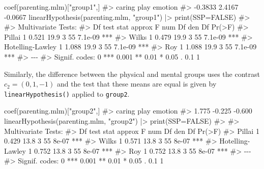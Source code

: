 \documentclass[
  letterpaper,
  10pt,
  krantz2]{krantz}
\makeatletter
\newenvironment{Shaded}{\begin{snugshade}}{\end{snugshade}}
\newcommand{\AttributeTok}[1]{\textcolor[rgb]{0.40,0.45,0.13}{#1}}
\newcommand{\CommentTok}[1]{\textcolor[rgb]{0.37,0.37,0.37}{#1}}
\newcommand{\ConstantTok}[1]{\textcolor[rgb]{0.56,0.35,0.01}{#1}}
\newcommand{\FunctionTok}[1]{\textcolor[rgb]{0.28,0.35,0.67}{#1}}
\newcommand{\NormalTok}[1]{\textcolor[rgb]{0.00,0.23,0.31}{#1}}
\newcommand{\SpecialCharTok}[1]{\textcolor[rgb]{0.37,0.37,0.37}{#1}}
\newcommand{\StringTok}[1]{\textcolor[rgb]{0.13,0.47,0.30}{#1}}
\newenvironment{kframe}{%
  \medskip{}
  \setlength{\fboxsep}{.8em}
  \def\at@end@of@kframe{}%
  \ifinner\ifhmode%
  \def\at@end@of@kframe{\end{minipage}}%
  \begin{minipage}{\columnwidth}%
  \fi\fi%
  \def\FrameCommand##1{\hskip\@totalleftmargin \hskip-\fboxsep
  \colorbox{shadecolor}{##1}\hskip-\fboxsep
      \hskip-\linewidth \hskip-\@totalleftmargin \hskip\columnwidth}%
  \MakeFramed {\advance\hsize-\width
    \@totalleftmargin\z@ \linewidth\hsize
    \@setminipage}}%
{\par\unskip\endMakeFramed%
  \at@end@of@kframe}
\renewenvironment{Shaded}{\begin{kframe}}{\end{kframe}}
\makeatother
\begin{document}
\begin{Shaded}
\begin{Highlighting}[]
\FunctionTok{coef}\NormalTok{(parenting.mlm)[}\StringTok{"group1"}\NormalTok{,]}
\CommentTok{\#\textgreater{}  caring    play emotion }
\CommentTok{\#\textgreater{} {-}0.3833  2.4167 {-}0.0667}
\FunctionTok{linearHypothesis}\NormalTok{(parenting.mlm, }\StringTok{"group1"}\NormalTok{) }\SpecialCharTok{|\textgreater{}} 
  \FunctionTok{print}\NormalTok{(}\AttributeTok{SSP=}\ConstantTok{FALSE}\NormalTok{)}
\CommentTok{\#\textgreater{} }
\CommentTok{\#\textgreater{} Multivariate Tests: }
\CommentTok{\#\textgreater{}                  Df test stat approx F num Df den Df  Pr(\textgreater{}F)    }
\CommentTok{\#\textgreater{} Pillai            1     0.521     19.9      3     55 7.1e{-}09 ***}
\CommentTok{\#\textgreater{} Wilks             1     0.479     19.9      3     55 7.1e{-}09 ***}
\CommentTok{\#\textgreater{} Hotelling{-}Lawley  1     1.088     19.9      3     55 7.1e{-}09 ***}
\CommentTok{\#\textgreater{} Roy               1     1.088     19.9      3     55 7.1e{-}09 ***}
\CommentTok{\#\textgreater{} {-}{-}{-}}
\CommentTok{\#\textgreater{} Signif. codes:  0 \textquotesingle{}***\textquotesingle{} 0.001 \textquotesingle{}**\textquotesingle{} 0.01 \textquotesingle{}*\textquotesingle{} 0.05 \textquotesingle{}.\textquotesingle{} 0.1 \textquotesingle{} \textquotesingle{} 1}
\end{Highlighting}
\end{Shaded}

Similarly, the difference between the physical and mental groups uses
the contrast \(c_2 = (0, 1, -1)\) and the test that these means are
equal is given by \texttt{linearHypothesis()} applied to
\texttt{group2}.

\begin{Shaded}
\begin{Highlighting}[]
\FunctionTok{coef}\NormalTok{(parenting.mlm)[}\StringTok{"group2"}\NormalTok{,]}
\CommentTok{\#\textgreater{}  caring    play emotion }
\CommentTok{\#\textgreater{}   1.775  {-}0.225  {-}0.600}
\FunctionTok{linearHypothesis}\NormalTok{(parenting.mlm, }\StringTok{"group2"}\NormalTok{) }\SpecialCharTok{|\textgreater{}} 
  \FunctionTok{print}\NormalTok{(}\AttributeTok{SSP=}\ConstantTok{FALSE}\NormalTok{)}
\CommentTok{\#\textgreater{} }
\CommentTok{\#\textgreater{} Multivariate Tests: }
\CommentTok{\#\textgreater{}                  Df test stat approx F num Df den Df Pr(\textgreater{}F)    }
\CommentTok{\#\textgreater{} Pillai            1     0.429     13.8      3     55  8e{-}07 ***}
\CommentTok{\#\textgreater{} Wilks             1     0.571     13.8      3     55  8e{-}07 ***}
\CommentTok{\#\textgreater{} Hotelling{-}Lawley  1     0.752     13.8      3     55  8e{-}07 ***}
\CommentTok{\#\textgreater{} Roy               1     0.752     13.8      3     55  8e{-}07 ***}
\CommentTok{\#\textgreater{} {-}{-}{-}}
\CommentTok{\#\textgreater{} Signif. codes:  0 \textquotesingle{}***\textquotesingle{} 0.001 \textquotesingle{}**\textquotesingle{} 0.01 \textquotesingle{}*\textquotesingle{} 0.05 \textquotesingle{}.\textquotesingle{} 0.1 \textquotesingle{} \textquotesingle{} 1}
\end{Highlighting}
\end{Shaded}
\end{document}
